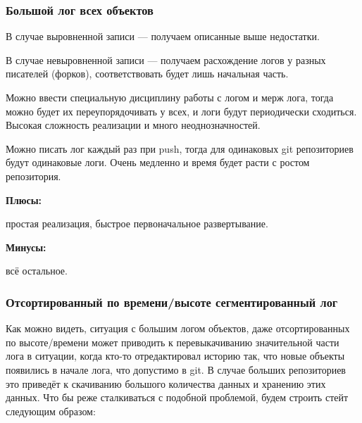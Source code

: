 \documentclass[11pt,a4paper]{article}
\begin{document}
\subsubsection{Большой лог всех объектов}

В случае выровненной записи --- получаем описанные выше недостатки.

В случае невыровненной записи --- получаем расхождение логов у разных писателей
(форков), соответствовать будет лишь начальная часть.

Можно ввести специальную дисциплину работы с логом и мерж лога, тогда можно
будет их переупорядочивать у всех, и логи будут периодически сходиться.  Высокая
сложность реализации и много неоднозначностей.

Можно писать лог каждый раз при push, тогда для одинаковых git репозиториев
будут одинаковые логи.  Очень медленно и время будет расти с ростом репозитория.

\textbf{Плюсы:}

простая реализация, быстрое первоначальное развертывание.

\textbf{Минусы:}

всё остальное.

\subsubsection{Отсортированный по времени/высоте сегментированный лог}

Как можно видеть, ситуация с большим логом объектов, даже отсортированных по
высоте/времени может приводить к перевыкачиванию значительной части лога в
ситуации, когда кто-то отредактировал историю так, что новые объекты появились в
начале лога, что допустимо в git. В случае больших репозиториев это приведёт к
скачиванию большого количества данных и хранению этих данных. Что бы реже
сталкиваться с подобной проблемой, будем строить стейт следующим образом:

\begin{figure}[h!]
\centering
\end{figure}
\end{document}
